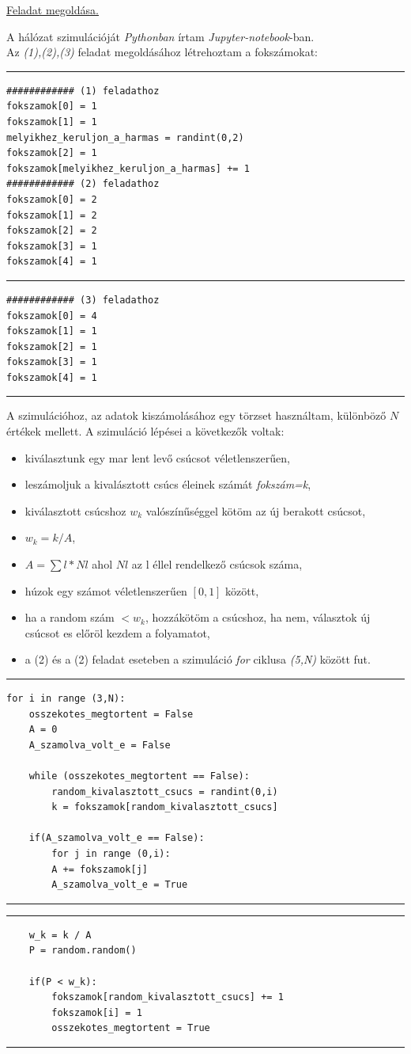 \documentclass[a4paper, 12pt]{article}
\numberwithin{equation}{section}          %
\numberwithin{figure}{subsection}
\begin{document}
\begin{center}
	\underline{Feladat megoldása.}
\end{center}

A hálózat szimulációját \textit{Pythonban} írtam \textit{Jupyter-notebook}-ban.\\
Az \textit{(1),(2),(3)} feladat megoldásához létrehoztam a fokszámokat: 
\newline
\rule{\textwidth}{0.1pt}
\begin{lstlisting}
############ (1) feladathoz 
fokszamok[0] = 1
fokszamok[1] = 1
melyikhez_keruljon_a_harmas = randint(0,2)
fokszamok[2] = 1
fokszamok[melyikhez_keruljon_a_harmas] += 1
############ (2) feladathoz 
fokszamok[0] = 2
fokszamok[1] = 2
fokszamok[2] = 2
fokszamok[3] = 1
fokszamok[4] = 1
\end{lstlisting}
\rule{\textwidth}{0.1pt}


\clearpage
\begin{lstlisting}
############ (3) feladathoz 
fokszamok[0] = 4
fokszamok[1] = 1
fokszamok[2] = 1
fokszamok[3] = 1
fokszamok[4] = 1
\end{lstlisting}
\rule{\textwidth}{0.1pt}

A szimulációhoz, az adatok kiszámolásához egy törzset használtam, különböző $N$ értékek mellett.
A szimuláció lépései a következők voltak:
\begin{itemize}
	\item kiválasztunk egy mar lent levő csúcsot véletlenszerűen,
	\item leszámoljuk a kivalásztott csúcs éleinek számát \textit{fokszám=k},
	\item kiválasztott csúcshoz $w_k$ valószínűséggel kötöm az új berakott csúcsot,
	\item $w_k = k/A$,
	\item $A = \sum l*Nl$ ahol $Nl$ az l éllel rendelkező csúcsok száma,
	\item húzok egy számot véletlenszerűen $[0,1]$ között,
	\item ha a random szám $< w_k$, hozzákötöm a csúcshoz, ha nem, választok új csúcsot es előröl kezdem a folyamatot,
	\item a (2) és a (2) feladat eseteben a szimuláció \textit{for} ciklusa \textit{(5,N)} között fut.	
\end{itemize}

\rule{\textwidth}{0.1pt}
\begin{lstlisting}
for i in range (3,N):
	osszekotes_megtortent = False
	A = 0
	A_szamolva_volt_e = False

	while (osszekotes_megtortent == False):
		random_kivalasztott_csucs = randint(0,i)
		k = fokszamok[random_kivalasztott_csucs]

	if(A_szamolva_volt_e == False):
		for j in range (0,i):
		A += fokszamok[j]
		A_szamolva_volt_e = True
\end{lstlisting}
\rule{\textwidth}{0.1pt}
\clearpage
\rule{\textwidth}{0.1pt}
\begin{lstlisting}
	w_k = k / A
	P = random.random()

	if(P < w_k):
		fokszamok[random_kivalasztott_csucs] += 1
		fokszamok[i] = 1
		osszekotes_megtortent = True
\end{lstlisting}
\rule{\textwidth}{0.1pt}
\end{document}
